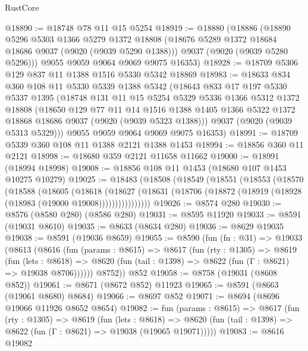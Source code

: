\begin{lexlean}{RustCore}
\begin{coremodule}
@18890 := @18748 @78 @11 @15 @5254
@18919 := @18880
    (@18886
      (@18890
        @5296
        @5303
        @1366
        @5279
        @1372
        @18808
        (@18676 @5289 @1372 @18684 @18686 @9037 (@9020 (@9039 @5290 @1388)))
        @9037
        (@9020 (@9039 @5280 @5296)))
      @9055
      @9059
      @9064
      @9069
      @9075
      @16353)
@18928 := @18709 @5306 @129 @837 @11 @1388 @1516 @5330 @5342 @18869
@18983 := @18633
    @834
    @360
    @108
    @11
    @5330
    @5339
    @1388
    @5342
    (@18643
      @833
      @17
      @197
      @5330
      @5337
      @1395
      (@18748
        @131
        @11
        @15
        @5254
        @5329
        @5336
        @1366
        @5312
        @1372
        @18808
        (@18650
          @129
          @77
          @11
          @14
          @1516
          @1388
          @1405
          @1366
          @5322
          @1372
          @18868
          @18686
          @9037
          (@9020 (@9039 @5323 @1388)))
        @9037
        (@9020 (@9039 @5313 @5329)))
      @9055
      @9059
      @9064
      @9069
      @9075
      @16353)
@18991 := @18709 @5339 @360 @108 @11 @1388 @2121 @1388 @1453
@18994 := @18856 @360 @11 @2121
@18998 := @18680 @359 @2121 @11658 @11662
@19000 := @18991 (@18994 @18998)
@19008 := @18856 @108 @11 @1453 (@18680 @107 @1453 @10275 @10279)
@19025 := @18483
    (@18508
      (@18549
        (@18551
          (@18553
            (@18570
              (@18588
                (@18605
                  (@18618
                    (@18627
                      (@18631 (@18706 (@18872 (@18919 (@18928 (@18983 (@19000 @19008))))))))))))))))
@19026 := @8574 @280
@19030 := @8576 (@8580 @280) (@8586 @280)
@19031 := @8595 @11920
@19033 := @8591 (@19031 @8610)
@19035 := @8633 (@8634 @280)
@19036 := @8629 @19035
@19038 := @8591 (@19036 @8659)
@19055 := @8590
    (fun (fn : @31) =>
    @19033
      (@8613
        (@8616
          (fun (params : @8615) =>
          @8617
            (fun (rty : @1305) =>
            @8619
              (fun (lets : @8618) =>
              @8620 (fun (tail : @1398) => @8622 (fun (Γ : @8621) => @19038 @8706))))))
        @8752))
    @852
@19058 := @8758 (@19031 (@8608 @852))
@19061 := @8671 (@8672 @852) @11923
@19065 := @8591 (@8663 (@19061 @8680) @8684)
@19066 := @8697 @852
@19071 := @8694 (@8696 @19066 @11926 @8652 @8654)
@19082 := fun (params : @8615) =>
  @8617
    (fun (rty : @1305) =>
    @8619
      (fun (lets : @8618) =>
      @8620 (fun (tail : @1398) => @8622 (fun (Γ : @8621) => @19038 (@19065 @19071)))))
@19083 := @8616 @19082

\end{coremodule}
\end{lexlean}
